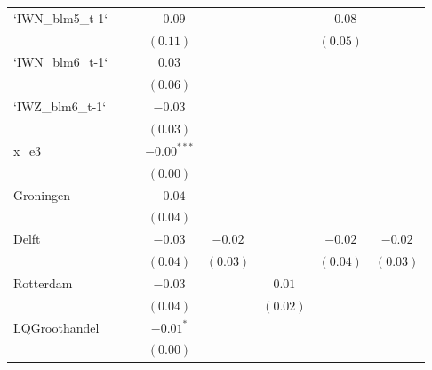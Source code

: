 \begin{center}
\begin{longtable}{l c c c c c c c }
`IWN\_blm5\_t-1` &               &              & $-0.09$       &               &               & $-0.08$       &               \\
                 &               &              & $(0.11)$      &               &               & $(0.05)$      &               \\
`IWN\_blm6\_t-1` &               &              & $0.03$        &               &               &               &               \\
                 &               &              & $(0.06)$      &               &               &               &               \\
`IWZ\_blm6\_t-1` &               &              & $-0.03$       &               &               &               &               \\
                 &               &              & $(0.03)$      &               &               &               &               \\
x\_e3            &               &              & $-0.00^{***}$ &               &               &               &               \\
                 &               &              & $(0.00)$      &               &               &               &               \\
Groningen        &               &              & $-0.04$       &               &               &               &               \\
                 &               &              & $(0.04)$      &               &               &               &               \\
Delft            &               &              & $-0.03$       & $-0.02$       &               & $-0.02$       & $-0.02$       \\
                 &               &              & $(0.04)$      & $(0.03)$      &               & $(0.04)$      & $(0.03)$      \\
Rotterdam        &               &              & $-0.03$       &               & $0.01$        &               &               \\
                 &               &              & $(0.04)$      &               & $(0.02)$      &               &               \\
LQGroothandel    &               &              & $-0.01^{*}$   &               &               &               &               \\
                 &               &              & $(0.00)$      &               &               &               &               \\

\end{longtable}
\end{center}
